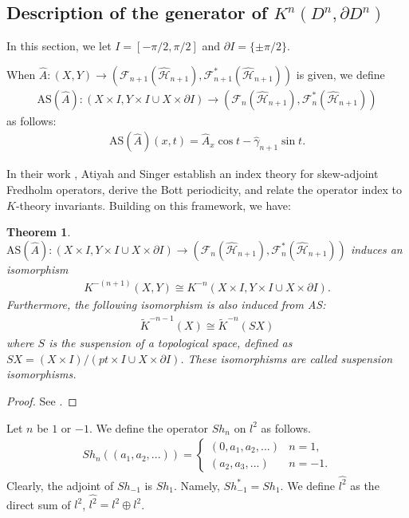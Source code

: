 \documentclass{amsart}
\newtheorem{thm}{Theorem}[section]
\theoremstyle{definition}
\theoremstyle{remark}
\begin{document}

\subsection{Description of the generator of $K^n(D^n,\partial D^n)$}
\label{subsec:Description of the generator}

In this section, we let $I=[-\pi/2, \pi/2]$ and $\partial I = \{\pm \pi/2\}$.

When \(\hat{A}: (X, Y) \to (\mathcal{F}_{n+1}(\mathcal{\hat{H}}_{n+1}), \mathcal{F}_{n+1}^{*}(\mathcal{\hat{H}}_{n+1}))\) 
is given, we define 
\begin{align*}
\mathrm{AS}(\hat{A}): (X \times I, Y \times I \cup X \times \partial I) 
\to (\mathcal{F}_{n}(\mathcal{\hat{H}}_{n+1}), \mathcal{F}^{*}_{n}(\mathcal{\hat{H}}_{n+1}))
\end{align*}
as follows:
\begin{align*}
\mathrm{AS}(\hat{A})(x,t)=\hat{A}_{x}\cos{t}-\hat{\gamma}_{n+1}\sin{t}.
\end{align*}

In their work \cite{A-Si}, Atiyah and Singer establish an index theory for skew-adjoint Fredholm operators, derive the Bott periodicity, and relate the operator index to $K$-theory invariants. Building on this framework, we have:

\begin{thm}
\(\mathrm{AS}(\hat{A}): (X \times I, Y \times I \cup X \times \partial I) \to (\mathcal{F}_{n}(\mathcal{\hat{H}}_{n+1}), \mathcal{F}^{*}_{n}(\mathcal{\hat{H}}_{n+1}))\) induces an isomorphism 
\begin{align*}
K^{-(n+1)}(X, Y) \cong K^{-n}(X \times I, Y \times I \cup X \times \partial I). 
\end{align*}
Furthermore, the following isomorphism is also induced from AS:
\begin{align*}
\tilde{K}^{-n-1}(X) \cong \tilde{K}^{-n}(SX)
\end{align*}
where \( S \) is the suspension of a topological space, defined as \( SX = (X \times I)/(pt \times I \cup X \times \partial I) \). These isomorphisms are called suspension isomorphisms.
\end{thm}

\begin{proof}
See \cite{A-Si}.
\end{proof}


Let $n$ be $1$ or $-1$. We define the operator $Sh_n$ on $l^2$ as follows.
\begin{align*}
Sh_n((a_1,a_2,...))=
\begin{cases}
	(0,a_1,a_2,...)& n=1,\\ 
	(a_2,a_3,...)& n=-1.
\end{cases}
\end{align*}
Clearly, the adjoint of $Sh_{-1}$ is $Sh_1$. Namely, $Sh_{-1}^* = Sh_1$.
We define $\hat{l^2}$ as the direct sum of $l^2$, $\hat{l^2} = l^2 \oplus l^2$.
\end{document}
